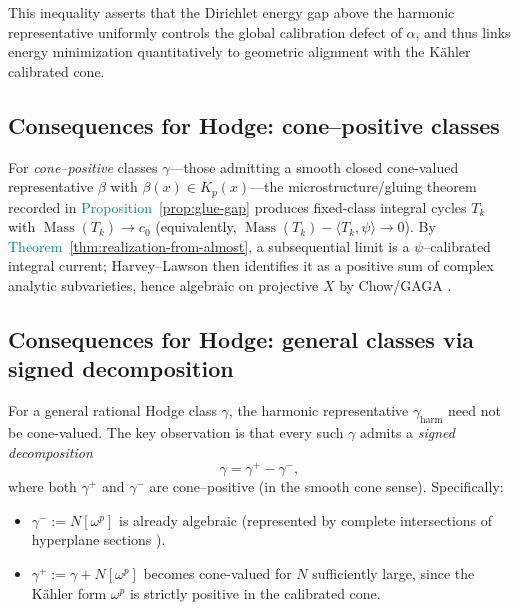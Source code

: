 \documentclass[11pt]{article}
\newcommand{\REVMZ}[1]{\textcolor{teal}{#1}}  %
\numberwithin{equation}{section}  %
\theoremstyle{plain}
\theoremstyle{definition}
\theoremstyle{remark}
\DeclareMathOperator{\Mass}{Mass}
\begin{document}
This inequality asserts that the Dirichlet energy gap above the harmonic
representative uniformly controls the global calibration defect of $\alpha$, and
thus links energy minimization quantitatively to geometric alignment with the
K\"ahler calibrated cone.

\subsection*{Consequences for Hodge: cone--positive classes}

For \emph{cone--positive} classes $\gamma$---those admitting a smooth closed cone-valued
representative $\beta$ with $\beta(x) \in K_p(x)$---the microstructure/gluing theorem
recorded in \REVMZ{Proposition~\ref{prop:glue-gap}} produces fixed-class integral
cycles $T_k$ with $\Mass(T_k)\to c_0$ (equivalently, $\Mass(T_k)-\langle T_k,\psi\rangle\to 0$).
By \REVMZ{Theorem~\ref{thm:realization-from-almost}}, a subsequential limit is a $\psi$--calibrated integral current; Harvey--Lawson \REVMZ{\cite{HL82}} then identifies it as a positive sum of complex analytic subvarieties, hence algebraic on projective $X$ by Chow/GAGA \REVMZ{\cite{Chow49,Serre56}}.

\subsection*{Consequences for Hodge: general classes via signed decomposition}

For a general rational Hodge class $\gamma$, the harmonic representative
$\gamma_{\mathrm{harm}}$ need not be cone-valued.  The key observation is that
every such $\gamma$ admits a \emph{signed decomposition}
\[
\gamma = \gamma^{+} - \gamma^{-},
\]
where both $\gamma^{+}$ and $\gamma^{-}$ are cone--positive (in the smooth cone sense).  Specifically:
\begin{itemize}
\item $\gamma^{-} := N[\omega^{p}]$ is already algebraic (represented by
complete intersections of hyperplane sections \REVMZ{\cite{GH78,Hartshorne77}}).
\item $\gamma^{+} := \gamma + N[\omega^{p}]$ becomes cone-valued for $N$
sufficiently large, since the K\"ahler form $\omega^{p}$ is strictly positive
in the calibrated cone.
\end{itemize}
\end{document}
